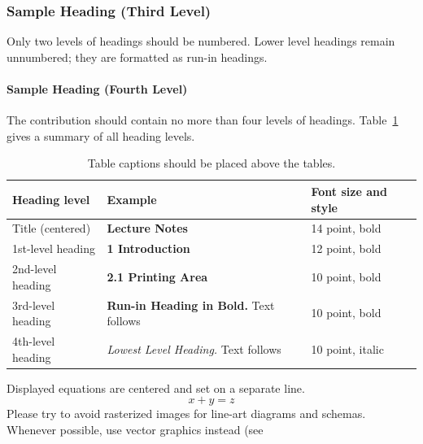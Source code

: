 \documentclass[runningheads]{llncs}
\begin{document}
\subsubsection{Sample Heading (Third Level)} Only two levels of
headings should be numbered. Lower level headings remain unnumbered;
they are formatted as run-in headings.

\paragraph{Sample Heading (Fourth Level)}
The contribution should contain no more than four levels of
headings. Table~\ref{tab1} gives a summary of all heading levels.

\begin{table}
\caption{Table captions should be placed above the
tables.}\label{tab1}
\begin{tabular}{|l|l|l|}
\hline
Heading level &  Example & Font size and style\\
\hline
Title (centered) &  {\Large\bfseries Lecture Notes} & 14 point, bold\\
1st-level heading &  {\large\bfseries 1 Introduction} & 12 point, bold\\
2nd-level heading & {\bfseries 2.1 Printing Area} & 10 point, bold\\
3rd-level heading & {\bfseries Run-in Heading in Bold.} Text follows & 10 point, bold\\
4th-level heading & {\itshape Lowest Level Heading.} Text follows & 10 point, italic\\
\hline
\end{tabular}
\end{table}


\noindent Displayed equations are centered and set on a separate
line.
\begin{equation}
x + y = z
\end{equation}
Please try to avoid rasterized images for line-art diagrams and
schemas. Whenever possible, use vector graphics instead (see
\end{document}
